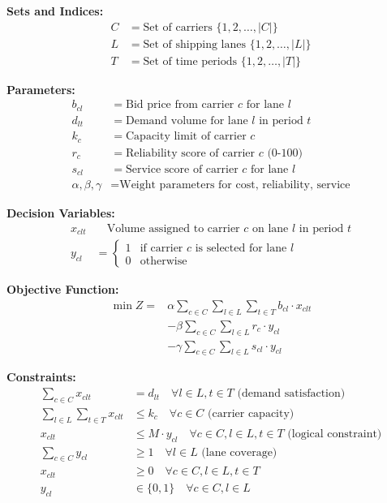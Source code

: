 \documentclass{article}
\begin{document}
\textbf{Sets and Indices:}
\begin{align}
C &= \text{Set of carriers } \{1, 2, \ldots, |C|\} \\
L &= \text{Set of shipping lanes } \{1, 2, \ldots, |L|\} \\
T &= \text{Set of time periods } \{1, 2, \ldots, |T|\}
\end{align}

\textbf{Parameters:}
\begin{align}
b_{cl} &= \text{Bid price from carrier } c \text{ for lane } l \\
d_{lt} &= \text{Demand volume for lane } l \text{ in period } t \\
k_{c} &= \text{Capacity limit of carrier } c \\
r_{c} &= \text{Reliability score of carrier } c \text{ (0-100)} \\
s_{cl} &= \text{Service score of carrier } c \text{ for lane } l \\
\alpha, \beta, \gamma &= \text{Weight parameters for cost, reliability, service}
\end{align}

\textbf{Decision Variables:}
\begin{align}
x_{clt} &\quad \text{Volume assigned to carrier } c \text{ on lane } l \text{ in period } t \\
y_{cl} &= \begin{cases} 1 & \text{if carrier } c \text{ is selected for lane } l \\ 0 & \text{otherwise} \end{cases}
\end{align}

\textbf{Objective Function:}
\begin{align}
\min Z = &\alpha \sum_{c \in C} \sum_{l \in L} \sum_{t \in T} b_{cl} \cdot x_{clt} \\
&- \beta \sum_{c \in C} \sum_{l \in L} r_c \cdot y_{cl} \\
&- \gamma \sum_{c \in C} \sum_{l \in L} s_{cl} \cdot y_{cl}
\end{align}

\textbf{Constraints:}
\begin{align}
\sum_{c \in C} x_{clt} &= d_{lt} \quad \forall l \in L, t \in T \text{ (demand satisfaction)} \\
\sum_{l \in L} \sum_{t \in T} x_{clt} &\leq k_c \quad \forall c \in C \text{ (carrier capacity)} \\
x_{clt} &\leq M \cdot y_{cl} \quad \forall c \in C, l \in L, t \in T \text{ (logical constraint)} \\
\sum_{c \in C} y_{cl} &\geq 1 \quad \forall l \in L \text{ (lane coverage)} \\
x_{clt} &\geq 0 \quad \forall c \in C, l \in L, t \in T \\
y_{cl} &\in \{0, 1\} \quad \forall c \in C, l \in L
\end{align}
\end{document}
